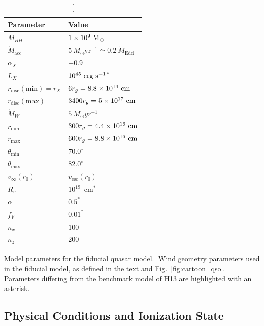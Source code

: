 \begin{table}
\centering
\begin{tabular}{p{3cm}p{4cm}}
\hline Parameter 	&	 Value \\ 
\hline \hline 
$M_{BH}$ 	 &	 $1\times 10^9~\rm{M_{\odot}}$ \\ 
$\dot{M}_{\mathrm{acc}}$ 	 &	 $5~M_{\odot}\mathrm{yr}^{-1} \simeq 0.2~\dot{M}_{\mathrm{Edd}}$\\ 
$\alpha_X$ 	 &	 $-0.9$ \\ 
$L_{X} $ 	 &	 $10^{45}~\rm{erg~s^{-1}}$$^*$ \\ 
$r_{\mathrm{disc}}(\mathrm{min})=r_{X}$   &	 $6r_g=8.8\times10^{14}~{\rm cm}$ \\ 
$r_{\mathrm{disc}}(\mathrm{max})$   &	 $3400r_g = 5\times10^{17}~{\rm cm}$ \\ 
$\dot{M}_W$  &	 $5~M_{\odot}yr^{-1}$ \\ 
$r_{\mathrm{min}}$ 	&	 $300r_{g} = 4.4\times10^{16}~{\rm cm}$\\ 
$r_{\mathrm{max}}$ 	&	 $600r_{g} = 8.8\times10^{16}~{\rm cm}$ \\ 
$\theta_{\mathrm{min}}$ 	&	 $70.0^{\circ}$ \\ 
$\theta_{\mathrm{max}}$ 	&	 $82.0^{\circ}$ \\ 
$v_{\infty}(r_0)$ 	&	 $v_{\mathrm{esc}}(r_0)$ \\ 
$R_v$  	        &	 $10^{19}$~cm$^*$ \\ 
$\alpha$ 	&	 $0.5^*$ \\
$f_V$ 	&	 $0.01^*$  \\
$n_x$ 	&	 $100$  \\
$n_z$ 	&	 $200$  \\
\hline 
\end{tabular}
\caption
[Model parameters for the fiducial quasar model.]
{Wind geometry parameters 
used in the fiducial model, as defined in the text and Fig.~\ref{fig:cartoon_qso}.
Parameters differing from the benchmark model of H13 are 
highlighted with an asterisk.}
\label{wind_param}
\end{table}



\subsection{Physical Conditions and Ionization State}


